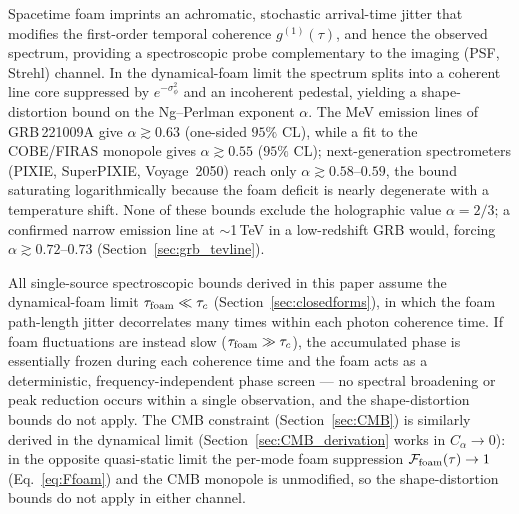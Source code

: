 \documentclass[aps,prd,onecolumn,amsmath,amssymb]{revtex4-2}
\begin{document}
Spacetime foam imprints an achromatic, stochastic arrival-time jitter
that modifies the first-order temporal coherence $g^{(1)}(\tau)$, and
hence the observed spectrum, providing a spectroscopic probe
complementary to the imaging (PSF, Strehl) channel.  In the
dynamical-foam limit the spectrum splits into a coherent line core
suppressed by $e^{-\sigma_\phi^2}$ and an incoherent pedestal, yielding
a shape-distortion bound on the Ng--Perlman exponent $\alpha$.  The MeV
emission lines of GRB\,221009A give $\alpha\gtrsim 0.63$ (one-sided
$95\%$ CL), while a fit to the COBE/FIRAS monopole gives
$\alpha\gtrsim 0.55$ ($95\%$ CL); next-generation
spectrometers (PIXIE, SuperPIXIE, Voyage~2050) reach only
$\alpha\gtrsim 0.58$--$0.59$, the bound saturating logarithmically
because the foam deficit is nearly degenerate with a temperature shift.
None of these bounds exclude the holographic value $\alpha=2/3$; a
confirmed narrow emission line at $\sim$1\,TeV in a low-redshift GRB
would, forcing $\alpha\gtrsim0.72$--$0.73$
(Section~\ref{sec:grb_tevline}).

All single-source spectroscopic bounds derived in this paper assume the
dynamical-foam limit $\tau_{\rm foam}\ll\tau_c$
(Section~\ref{sec:closedforms}), in which the foam path-length jitter
decorrelates many times within each photon coherence time.  If foam
fluctuations are instead slow ($\tau_{\rm foam}\gg\tau_c$), the
accumulated phase is essentially frozen during each coherence time and
the foam acts as a deterministic, frequency-independent phase screen
--- no spectral broadening or peak reduction occurs within a single
observation, and the shape-distortion bounds do not apply.  The CMB
constraint (Section~\ref{sec:CMB}) is similarly derived in the
dynamical limit (Section~\ref{sec:CMB_derivation} works in
$C_\alpha\to 0$): in the opposite quasi-static limit the per-mode
foam suppression $\mathcal{F}_{\rm foam}(\tau)\to 1$
(Eq.~\eqref{eq:Ffoam}) and the CMB monopole is unmodified, so the
shape-distortion bounds do not apply in either channel.
\end{document}
